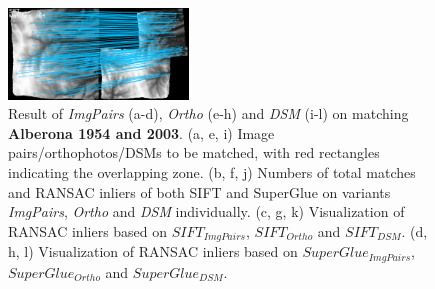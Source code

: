 \begin{figure}[htbp]
\begin{center}
{\begin{minipage}[t]{0.48\linewidth}
				\centering
				\includegraphics[width=4.8cm]{images/Chapitre3/Homol-SIFT2Step-Rough-2DRANSAC_MEC-Malt_Tapas_1954_MEC-Malt_Tapas_2003.png}
			\end{minipage}%
		}
		\caption{Result of \textit{ImgPairs} (a-d), \textit{Ortho} (e-h) and \textit{DSM} (i-l) on matching \textbf{Alberona 1954 and 2003}. (a, e, i) Image pairs/orthophotos/\ac{DSM}s to be matched, with red rectangles indicating the overlapping zone. (b, f, j) Numbers of total matches and RANSAC inliers of both SIFT and SuperGlue on variants \textit{ImgPairs}, \textit{Ortho} and \textit{DSM} individually. (c, g, k) Visualization of RANSAC inliers based on $SIFT_{ImgPairs}$, $SIFT_{Ortho}$ and $SIFT_{DSM}$. (d, h, l) Visualization of RANSAC inliers based on $SuperGlue_{ImgPairs}$, $SuperGlue_{Ortho}$ and $SuperGlue_{DSM}$.}
		\label{MatchVizAlberona1954DSM}
	\end{center}
\end{figure} 



